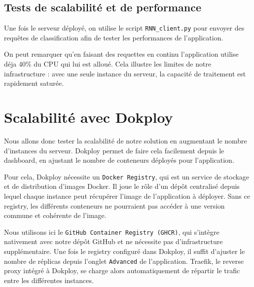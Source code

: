 \documentclass{rapportClass} %
\begin{document}
\subsection{Tests de scalabilité et de performance}
Une fois le serveur déployé, on utilise le script \texttt{RNN\_client.py} pour envoyer des requêtes de classification 
afin de tester les performances de l’application. 

On peut remarquer qu'en faisant des requettes en continu l'application utilise déja 40\% du CPU qui lui est alloué.
Cela illustre les limites de notre infrastructure : avec une seule instance du serveur, la capacité de traitement est rapidement saturée.

\section{Scalabilité avec Dokploy}
Nous allons donc tester la scalabilité de notre solution en augmentant le nombre d'instances du serveur. 
Dokploy permet de faire cela facilement depuis le dashboard, en ajustant le nombre de conteneurs déployés pour 
l'application.

Pour cela, Dokploy nécessite un \texttt{Docker Registry}, qui est un service de stockage et de distribution d'images Docker. 
Il joue le rôle d'un dépôt centralisé depuis lequel chaque instance peut récupérer l'image de l'application à déployer. 
Sans ce registry, les différents conteneurs ne pourraient pas accéder à une version commune et cohérente de l'image.

Nous utilisons ici le \texttt{GitHub Container Registry (GHCR)}, qui s'intègre nativement avec notre dépôt GitHub et 
ne nécessite pas d'infrastructure supplémentaire. Une fois le registry configuré dans Dokploy, il suffit d'ajuster 
le nombre de réplicas depuis l'onglet \texttt{Advanced} de l'application. Traefik, le reverse proxy intégré à Dokploy, 
se charge alors automatiquement de répartir le trafic entre les différentes instances.





\end{document}
